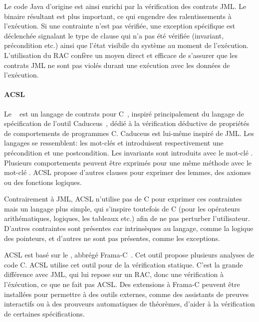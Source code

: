Le code Java d'origine est ainsi enrichi par la vérification des contrats JML.
Le binaire résultant est plus important, ce qui engendre des ralentissements à
l'exécution. Si une contrainte n'est pas vérifiée, une exception spécifique est
déclenchée signalant le type de clause qui n'a pas été vérifiée (invariant,
précondition etc.) ainsi que l'état visibile du système au moment de
l'exécution.  L'utilisation du RAC confère un moyen direct et efficace de
s'assurer que les contrats JML ne sont pas violés durant une exécution avec les
données de l'exécution.

\paragraph{ACSL} Le ~ est
un langage de contrats pour C~, inspiré principalement du langage de
spécification de l'outil Caduceus~, dédié à la vérification
déductive de propriétés de comportements de programmes C. Caduceus est lui-même
inspiré de JML. Les langages se ressemblent: les mot-clés  et
 introduisent respectivement une précondition et une
postcondition. Les invariants sont introduits avec le mot-clé .
Plusieurs comportements peuvent être exprimés pour une même méthode avec le
mot-clé . ACSL propose d'autres clauses pour exprimer des
lemmes, des axiomes ou des fonctions logiques.

Contrairement à JML, ACSL n'utilise pas de C pour exprimer ces contraintes mais
un langage plus simple, qui s'inspire toutefois de C (pour les opérateurs
arithématiques, logiques, les tableaux etc.) afin de ne pas perturber
l'utilisateur. D'autres contraintes sont présentes car intrinsèques au langage,
comme la logique des pointeurs, et d'autres ne sont pas présentes, comme les
exceptions.

ACSL est basé sur le , abbrégé
Frama-C~. Cet outil propose plusieurs analyses de code C. ACSL
utilise cet outil pour de la vérification statique. C'est la grande différence
avec JML, qui lui repose sur un RAC, donc une vérification à l'éxécution, ce que
ne fait pas ACSL. Des extensions à Frama-C peuvent être installées pour
permettre à des outils externes, comme des assistants de preuves interactifs ou
à des prouveurs automatiques de théorèmes, d'aider à la vérification de
certaines spécifications.

